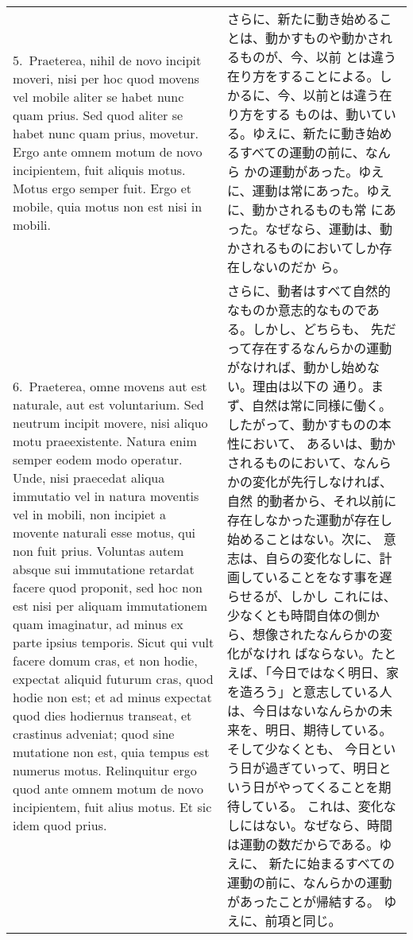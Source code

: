 \documentclass[10pt]{jsarticle} %
\begin{document}
\begin{longtable}{p{21em}p{21em}}
\\



5.~{\sc Praeterea}, nihil de novo incipit moveri, nisi per hoc quod movens vel
 mobile aliter se habet nunc quam prius. Sed quod aliter se habet nunc
 quam prius, movetur. Ergo ante omnem motum de novo incipientem, fuit
 aliquis motus. Motus ergo semper fuit. Ergo et mobile, quia motus non
 est nisi in mobili.

&


さらに、新たに動き始めることは、動かすものや動かされるものが、今、以前
とは違う在り方をすることによる。しかるに、今、以前とは違う在り方をする
ものは、動いている。ゆえに、新たに動き始めるすべての運動の前に、なんら
かの運動があった。ゆえに、運動は常にあった。ゆえに、動かされるものも常
にあった。なぜなら、運動は、動かされるものにおいてしか存在しないのだか
ら。

\\


6.~{\sc Praeterea}, omne movens aut est naturale, aut est voluntarium. Sed
 neutrum incipit movere, nisi aliquo motu praeexistente. Natura enim
 semper eodem modo operatur. Unde, nisi praecedat aliqua immutatio vel
 in natura moventis vel in mobili, non incipiet a movente naturali esse
 motus, qui non fuit prius. Voluntas autem absque sui immutatione
 retardat facere quod proponit, sed hoc non est nisi per aliquam
 immutationem quam imaginatur, ad minus ex parte ipsius temporis. Sicut
 qui vult facere domum cras, et non hodie, expectat aliquid futurum
 cras, quod hodie non est; et ad minus expectat quod dies hodiernus
 transeat, et crastinus adveniat; quod sine mutatione non est, quia
 tempus est numerus motus. Relinquitur ergo quod ante omnem motum de
 novo incipientem, fuit alius motus. Et sic idem quod prius.

&

さらに、動者はすべて自然的なものか意志的なものである。しかし、どちらも、
先だって存在するなんらかの運動がなければ、動かし始めない。理由は以下の
通り。まず、自然は常に同様に働く。したがって、動かすものの本性において、
あるいは、動かされるものにおいて、なんらかの変化が先行しなければ、自然
的動者から、それ以前に存在しなかった運動が存在し始めることはない。次に、
意志は、自らの変化なしに、計画していることをなす事を遅らせるが、しかし
これには、少なくとも時間自体の側から、想像されたなんらかの変化がなけれ
ばならない。たとえば、「今日ではなく明日、家を造ろう」と意志している人
は、今日はないなんらかの未来を、明日、期待している。そして少なくとも、
今日という日が過ぎていって、明日という日がやってくることを期待している。
これは、変化なしにはない。なぜなら、時間は運動の数だからである。ゆえに、
新たに始まるすべての運動の前に、なんらかの運動があったことが帰結する。
ゆえに、前項と同じ。

\end{longtable}
\end{document}
